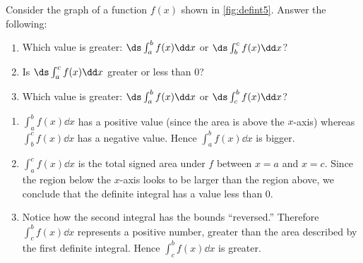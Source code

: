 \begin{example}\label{ex_defint5}%
Consider the graph of a function $f(x)$ shown in \autoref{fig:defint5}. Answer the following:
%
%
\begin{enumerate}
	\item	Which value is greater: $\ds \int_a^b f(x)\dd x$ or $\ds \int_b^c f(x)\dd x$?
	\item	Is $\ds \int_a^c f(x)\dd x$ greater or less than 0?
	\item	Which value is greater: $\ds \int_a^b f(x)\dd x$ or $\ds \int_c^b f(x)\dd x$?
\end{enumerate}
\solution
\begin{enumerate}
	\item	$\int_a^b f(x)\dd x$ has a positive value (since the area is above the $x$-axis) whereas $\int_b^c f(x)\dd x$ has a negative value. Hence $\int_a^b f(x)\dd x$ is bigger.
	\item	$\int_a^c f(x)\dd x$ is the total signed area under $f$ between $x=a$ and $x=c$. Since the region below the $x$-axis looks to be larger than the region above, we conclude that the definite integral has a value less than 0.
	\item	Notice how the second integral has the bounds ``reversed.'' Therefore $\int_c^b f(x)\dd x$ represents a positive number, greater than the area described by the first definite integral. Hence $\int_c^b f(x)\dd x$ is greater.
\end{enumerate}
\end{example}

